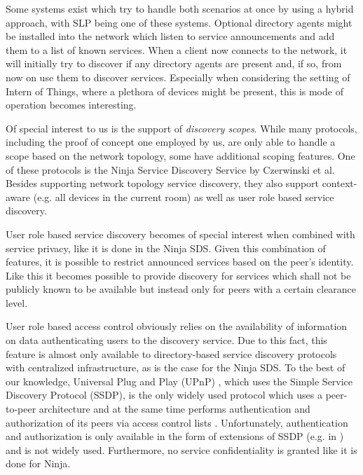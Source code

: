 Some systems exist which try to handle both scenarios at once by using a hybrid approach, with SLP being one of these systems.
Optional directory agents might be installed into the network which listen to service announcements and add them to a list of known services.
When a client now connects to the network, it will initially try to discover if any directory agents are present and, if so, from now on use them to discover services.
Especially when considering the setting of Intern of Things, where a plethora of devices might be present, this is mode of operation becomes interesting.

Of special interest to us is the support of \emph{discovery scopes}.
While many protocols, including the proof of concept one employed by us, are only able to handle a scope based on the network topology, some have additional scoping features.
One of these protocols is the Ninja Service Discovery Service \cite{czerwinski1999architecture} by Czerwinski et al.
Besides supporting network topology service discovery, they also support context-aware (e.g. all devices in the current room) as well as user role based service discovery.

User role based service discovery becomes of special interest when combined with service privacy, like it is done in the Ninja SDS.
Given this combination of features, it is possible to restrict announced services based on the peer's identity.
Like this it becomes possible to provide discovery for services which shall not be publicly known to be available but instead only for peers with a certain clearance level.

User role based access control obviously relies on the availability of information on data authenticating users to the discovery service.
Due to this fact, this feature is almost only available to directory-based service discovery protocols with centralized infrastructure, as is the case for the Ninja SDS.
To the best of our knowledge, Universal Plug and Play (UPnP) \cite{miller2001home}, which uses the Simple Service Discovery Protocol (SSDP), is the only widely used protocol which uses a peer-to-peer architecture and at the same time performs authentication and authorization of its peers via access control lists \cite{zhu2005service,edwards2006discovery}.
Unfortunately, authentication and authorization is only available in the form of extensions of SSDP (e.g.  in \cite{ellison2003device}) and is not widely used.
Furthermore, no service confidentiality is granted like it is done for Ninja.


